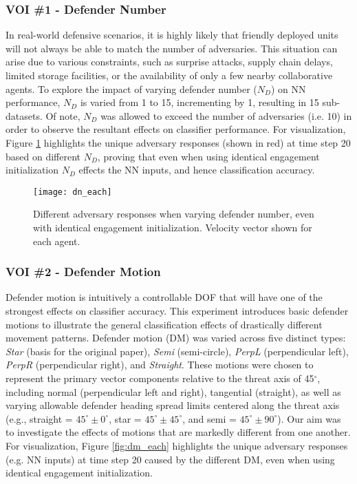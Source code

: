 \documentclass[journal]{IEEEtran} %
\begin{document}
\subsubsection{VOI \#1 - Defender Number}
In real-world defensive scenarios, it is highly likely that friendly deployed units will not always be able to match the number of adversaries. This situation can arise due to various constraints, such as surprise attacks, supply chain delays, limited storage facilities, or the availability of only a few nearby collaborative agents. To explore the impact of varying defender number ($N_D$) on NN performance, $N_D$ is varied from 1 to 15, incrementing by 1, resulting in 15 sub-datasets. Of note, $N_D$ was allowed to exceed the number of adversaries (i.e. 10) in order to observe the resultant effects on classifier performance. For visualization, Figure \ref{fig:dn_each} highlights the unique adversary responses (shown in red) at time step 20 based on different $N_D$, proving that even when using identical engagement initialization $N_D$ effects the NN inputs, and hence classification accuracy.

\begin{figure}[h]
    \centering
    \texttt{[image: dn\_each]}
    \caption{Different adversary responses when varying defender number, even with identical engagement initialization. Velocity vector shown for each agent.}
    \label{fig:dn_each}
\end{figure}


\subsubsection{VOI \#2 - Defender Motion}
Defender motion is intuitively a controllable DOF that will have one of the strongest effects on classifier accuracy. This experiment introduces basic defender motions to illustrate the general classification effects of drastically different movement patterns. Defender motion (DM) was varied across five distinct types: \textit{Star} (basis for the original paper), \textit{Semi} (semi-circle), \textit{PerpL} (perpendicular left), \textit{PerpR} (perpendicular right), and \textit{Straight}. These motions were chosen to represent the primary vector components relative to the threat axis of 45$^\circ$, including normal (perpendicular left and right), tangential (straight), as well as varying allowable defender heading spread limits centered along the threat axis (e.g., straight = $45^\circ\pm 0^\circ$, star = $45^\circ\pm 45^\circ$, and semi = $45^\circ\pm 90^\circ$). Our aim was to investigate the effects of motions that are markedly different from one another. For visualization, Figure \ref{fig:dm_each} highlights the unique adversary responses (e.g. NN inputs) at time step 20 caused by the different DM, even when using identical engagement initialization.
\end{document}
